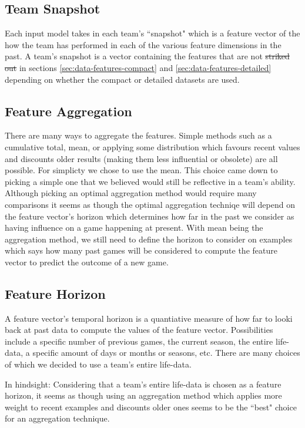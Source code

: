 \documentclass{article} %
\begin{document}
\subsection{Team Snapshot}
\label{sec:data-team-snapshot}

Each input model takes in each team's ``snapshot" which is a feature vector of the how the team has performed in each of the various feature dimensions in the past.  A team's snapshot is a vector containing the features that are not \sout{striked out} in sections \ref{sec:data-features-compact} and \ref{sec:data-features-detailed} depending on whether the compact or detailed datasets are used.

\subsection{Feature Aggregation}
\label{sec:feature-aggregation}

There are many ways to aggregate the features.  Simple methods such as a cumulative total, mean, or applying some distribution which favours recent values and discounts older results (making them less influential or obsolete) are all possible.  For simplicty we chose to use the mean.  This choice came down to picking a simple one that we believed would still be reflective in a team's ability.  Although picking an optimal aggregation method would require many comparisons it seems as though the optimal aggregation techniqe will depend on the feature vector's horizon which determines how far in the past we consider as having influence on a game happening at present.  With mean being the aggregation method, we still need to define the horizon to consider on examples which says how many past games will be considered to compute the feature vector to predict the outcome of a new game.

\subsection{Feature Horizon}
\label{sec:feature-horizon}

A feature vector's temporal horizon is a quantiative measure of how far to looki back at past data to compute the values of the feature vector.  Possibilities include a specific number of previous games, the current season, the entire life-data, a specific amount of days or months or seasons, etc.  There are many choices of which we decided to use a team's entire life-data.

In hindsight: Considering that a team's entire life-data is chosen as a feature horizon, it seems as though using an aggregation method which applies more weight to recent examples and discounts older ones seems to be the ``best" choice for an aggregation technique.
\end{document}

